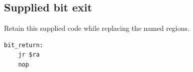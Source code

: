 \subsection*{Supplied bit exit}
Retain this supplied code while replacing the named regions.

\begin{verbatim}
bit_return:
    jr $ra
    nop
\end{verbatim}
